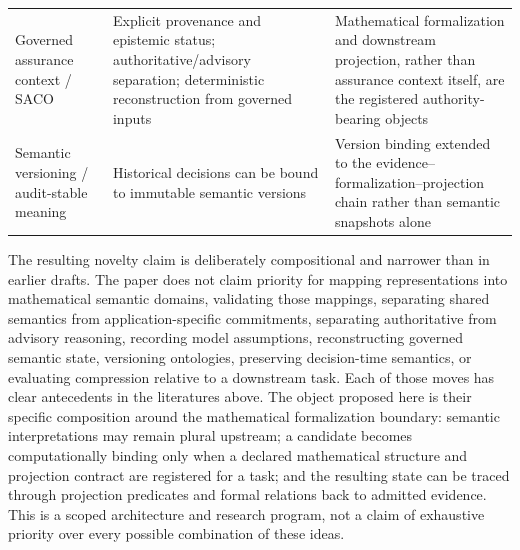 \documentclass[11pt,a4paper]{article}
\begin{document}
\begin{longtable}{P{3.1cm}P{4.5cm}P{5.0cm}}
Governed assurance context / SACO & Explicit provenance and epistemic status; authoritative/advisory separation; deterministic reconstruction from governed inputs & Mathematical formalization and downstream projection, rather than assurance context itself, are the registered authority-bearing objects \\
Semantic versioning / audit-stable meaning & Historical decisions can be bound to immutable semantic versions & Version binding extended to the evidence--formalization--projection chain rather than semantic snapshots alone \\
\end{longtable}

The resulting novelty claim is deliberately compositional and narrower than in earlier drafts. The paper does not claim priority for mapping representations into mathematical semantic domains, validating those mappings, separating shared semantics from application-specific commitments, separating authoritative from advisory reasoning, recording model assumptions, reconstructing governed semantic state, versioning ontologies, preserving decision-time semantics, or evaluating compression relative to a downstream task. Each of those moves has clear antecedents in the literatures above. The object proposed here is their specific composition around the mathematical formalization boundary: semantic interpretations may remain plural upstream; a candidate becomes computationally binding only when a declared mathematical structure and projection contract are registered for a task; and the resulting state can be traced through projection predicates and formal relations back to admitted evidence. This is a scoped architecture and research program, not a claim of exhaustive priority over every possible combination of these ideas.
\end{document}
